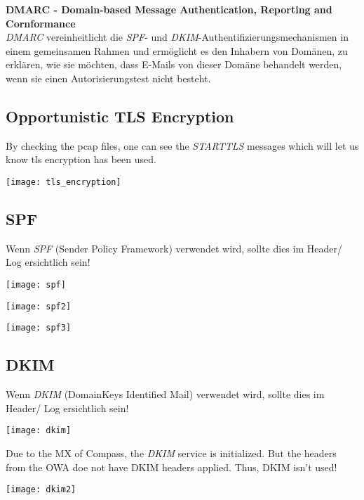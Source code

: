 \textbf{DMARC - Domain-based Message Authentication, Reporting and Cornformance}\\
\textit{DMARC} vereinheitlicht die \textit{SPF}- und \textit{DKIM}-Authentifizierungsmechanismen in einem gemeinsamen Rahmen und ermöglicht es den Inhabern von Domänen, zu erklären, wie sie möchten, dass E-Mails von dieser Domäne behandelt werden, wenn sie einen Autorisierungstest nicht besteht.


\subsection{Opportunistic TLS Encryption}
By checking the pcap files, one can see the \textit{STARTTLS} messages which will let us know tls encryption has been used.

\begin{center}
    \texttt{[image: tls\_encryption]}
\end{center}

\subsection{SPF}
Wenn \textit{SPF} (Sender Policy Framework) verwendet wird, sollte dies im Header/ Log ersichtlich sein!
\begin{center}
    \texttt{[image: spf]}
\end{center}
\texttt{[image: spf2]}
\begin{center}
    \texttt{[image: spf3]}
\end{center}


\subsection{DKIM}
Wenn \textit{DKIM} (DomainKeys Identified Mail) verwendet wird, sollte dies im Header/ Log ersichtlich sein!

\begin{center}
    \texttt{[image: dkim]}
\end{center}

Due to the MX of Compass, the \textit{DKIM} service is initialized. But the headers from the OWA doe not have DKIM headers applied. Thus, DKIM isn't used!

\begin{center}
    \texttt{[image: dkim2]}
\end{center}


